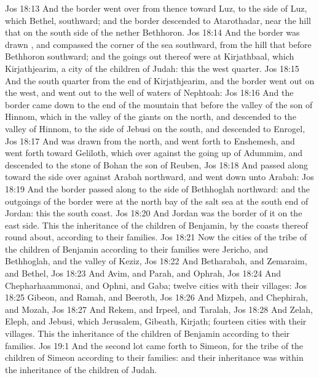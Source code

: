 \vs Jos 18:13 And the border went over from thence toward Luz, to the side of Luz, which  Bethel, southward; and the border descended to Atarothadar, near the hill that  on the south side of the nether Bethhoron.
\vs Jos 18:14 And the border was drawn , and compassed the corner of the sea southward, from the hill that  before Bethhoron southward; and the goings out thereof were at Kirjathbaal, which  Kirjathjearim, a city of the children of Judah: this  the west quarter.
\vs Jos 18:15 And the south quarter  from the end of Kirjathjearim, and the border went out on the west, and went out to the well of waters of Nephtoah:
\vs Jos 18:16 And the border came down to the end of the mountain that  before the valley of the son of Hinnom,  which  in the valley of the giants on the north, and descended to the valley of Hinnom, to the side of Jebusi on the south, and descended to Enrogel,
\vs Jos 18:17 And was drawn from the north, and went forth to Enshemesh, and went forth toward Geliloth, which  over against the going up of Adummim, and descended to the stone of Bohan the son of Reuben,
\vs Jos 18:18 And passed along toward the side over against Arabah northward, and went down unto Arabah:
\vs Jos 18:19 And the border passed along to the side of Bethhoglah northward: and the outgoings of the border were at the north bay of the salt sea at the south end of Jordan: this  the south coast.
\vs Jos 18:20 And Jordan was the border of it on the east side. This  the inheritance of the children of Benjamin, by the coasts thereof round about, according to their families.
\vs Jos 18:21 Now the cities of the tribe of the children of Benjamin according to their families were Jericho, and Bethhoglah, and the valley of Keziz,
\vs Jos 18:22 And Betharabah, and Zemaraim, and Bethel,
\vs Jos 18:23 And Avim, and Parah, and Ophrah,
\vs Jos 18:24 And Chepharhaammonai, and Ophni, and Gaba; twelve cities with their villages:
\vs Jos 18:25 Gibeon, and Ramah, and Beeroth,
\vs Jos 18:26 And Mizpeh, and Chephirah, and Mozah,
\vs Jos 18:27 And Rekem, and Irpeel, and Taralah,
\vs Jos 18:28 And Zelah, Eleph, and Jebusi, which  Jerusalem, Gibeath,  Kirjath; fourteen cities with their villages. This  the inheritance of the children of Benjamin according to their families.
\vs Jos 19:1 And the second lot came forth to Simeon,  for the tribe of the children of Simeon according to their families: and their inheritance was within the inheritance of the children of Judah.
